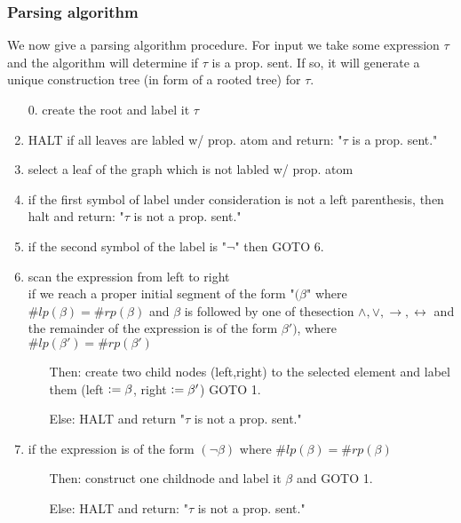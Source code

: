 \subsubsection*{Parsing algorithm}
We now give a parsing algorithm procedure. For input we take some expression $\tau$ and the algorithm will determine if $\tau$ is a prop. sent.
If so, it will generate a unique construction tree (in form of a rooted tree) for $\tau$.
\begin{enumerate}
    \item[0.] create the root and label it $\tau$
    \item HALT if all leaves are labled w/ prop. atom and return: "$\tau$ is a prop. sent."
    \item select a leaf of the graph which is not labled w/ prop. atom
    \item if the first symbol of label under consideration is not a left parenthesis, then halt and return: "$\tau$ is not a prop. sent."
    \item if the second symbol of the label is "$\lnot$" then GOTO 6.
    \item scan the expression from left to right\\
    if we reach a proper initial segment of the form "$(\beta$" where $\# lp(\beta) = \#rp(\beta)$ and $\beta$ is followed by one of thesection
    $\land,\lor,\to,\leftrightarrow$ and the remainder of the expression is of the form $\beta')$, where $\# lp(\beta') = \#rp(\beta')$
    \begin{itemize}
        \item [Then:] create two child nodes (left,right) to the selected element and label them (left $\vcentcolon= \beta$, right $\vcentcolon= \beta'$) GOTO 1.
        \item [Else:] HALT and return "$\tau$ is not a prop. sent."
    \end{itemize}
    
    \item if the expression is of the form $(\lnot \beta)$ where $\# lp(\beta) = \#rp(\beta)$
    \begin{itemize}
        \item [Then:] construct one childnode and label it $\beta$ and GOTO 1.
        \item [Else:] HALT and return: "$\tau$ is not a prop. sent."
    \end{itemize}
\end{enumerate}

